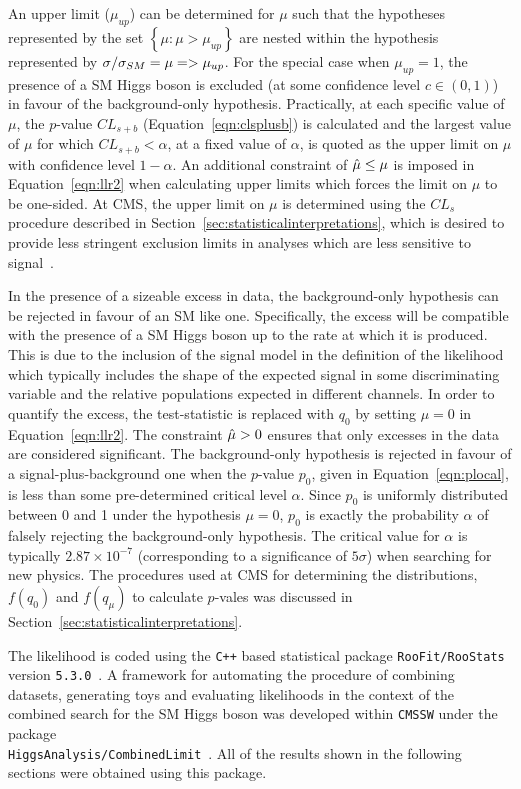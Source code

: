 An upper limit ($\mu_{up}$) can be determined for $\mu$ such that
the hypotheses represented by the set $\left\{ \mu:\mu>\mu_{up} \right\}$
are nested within the hypothesis represented by $\sigma/\sigma_{SM}=\mu=>\mu_{up}$.
For the special case when $\mu_{up}=1$, the presence of a SM Higgs boson is excluded
(at some confidence level $c\in(0,1)$) in favour of the background-only hypothesis.
Practically, at each specific value of $\mu$, the $p$-value $CL_{s+b}$ 
(Equation~\ref{eqn:clsplusb}) 
is calculated and the largest value of $\mu$ for which $CL_{s+b}<\alpha$,
at a fixed value of $\alpha$, is quoted as the upper limit on $\mu$ with confidence level 
$1-\alpha$. An additional constraint of $\hat{\mu} \le \mu$ is imposed in Equation~\ref{eqn:llr2} 
when calculating upper limits which forces the limit on $\mu$ to be one-sided.
At CMS, the upper limit on $\mu$ is determined using the $CL_{s}$
procedure described in Section~\ref{sec:statisticalinterpretations}, which is
desired to provide less stringent exclusion limits in analyses which are less sensitive
to signal~\citep{cls}. 

In the presence of a sizeable excess in data, the background-only hypothesis
can be rejected in favour of an SM like one. Specifically, the excess 
will be compatible with the presence of a SM Higgs boson up to the rate
at which it is produced. This is due to the inclusion of the signal model 
in the definition of the likelihood which typically includes the shape of 
the expected signal in some discriminating variable and the relative populations
expected in different channels.
In order to quantify the excess, the test-statistic
is replaced with $q_{0}$ by setting $\mu=0$ in Equation~\ref{eqn:llr2}.
The constraint $\hat{\mu}>0$ ensures that only excesses in the data are considered significant.
The background-only hypothesis is rejected in favour of a signal-plus-background one
when the $p$-value $p_{0}$, given in Equation~\ref{eqn:plocal},
is less than some pre-determined critical level $\alpha$.
Since $p_{0}$ is uniformly distributed between 0 and 1 under the hypothesis $\mu=0$,
$p_{0}$ is exactly the probability $\alpha$ of falsely rejecting the background-only hypothesis.
The critical value for $\alpha$ is typically $2.87\times10^{-7}$ (corresponding 
to a significance of $5\sigma$) when searching for new physics.  
The procedures used at CMS for determining the distributions, $f(q_{0})$ and $f(q_{\mu})$
to calculate $p$-vales was discussed in Section~\ref{sec:statisticalinterpretations}.

The likelihood is coded using the \texttt{C++} based 
statistical package \texttt{RooFit/RooStats} version \texttt{5.3.0}~\citep{roofit}. 
A framework for automating the procedure of combining datasets, generating toys
and evaluating likelihoods in the context of the combined search for the SM Higgs boson
was developed within \texttt{CMSSW} 
under the package \\
\texttt{HiggsAnalysis/CombinedLimit}~\citep{combinationstwiki}.
All of the results shown in the following sections were obtained using this package.

